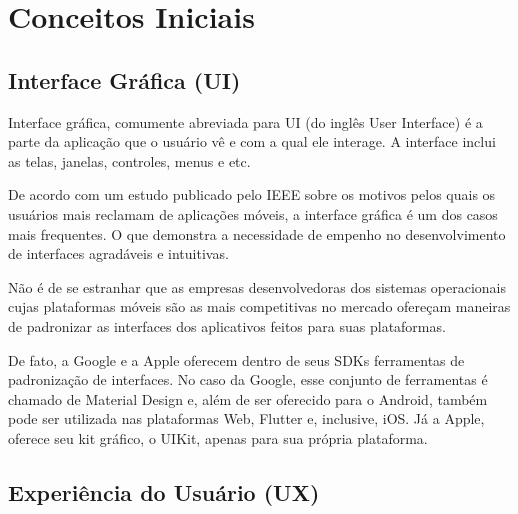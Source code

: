 \chapter{Conceitos Iniciais}

\section{Interface Gr\'afica (UI)}
Interface gráfica, comumente abreviada para UI (do inglês User Interface) é a 
parte da aplicação que o usuário vê e com a qual ele interage. \cite{Chong2004}
A interface inclui as telas, janelas, controles, menus e etc. \cite{Chong2004}

De acordo com um estudo publicado pelo IEEE \cite{Khalid2015} sobre os motivos pelos 
quais os usuários mais reclamam de aplicações móveis, a interface gráfica é um dos 
casos mais frequentes. O que demonstra a necessidade de empenho no desenvolvimento
de interfaces agradáveis e intuitivas.

Não é de se estranhar que as empresas desenvolvedoras dos sistemas operacionais
cujas plataformas móveis são as mais competitivas no mercado ofereçam maneiras de
padronizar as interfaces dos aplicativos feitos para suas plataformas.

De fato, a Google e a Apple oferecem dentro de seus SDKs ferramentas de padronização
de interfaces. No caso da Google, esse conjunto de ferramentas
é chamado de Material Design e, além de ser oferecido para o Android, também
pode ser utilizada nas plataformas Web, Flutter e, inclusive, iOS.
Já a Apple, oferece seu kit gráfico, o UIKit, apenas para sua própria plataforma.

\section{Experiência do Usu\'ario (UX)}